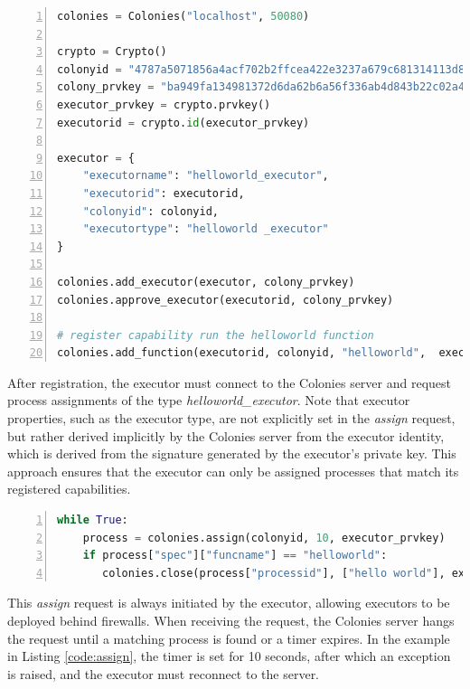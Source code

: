 \documentclass{article}
\begin{document}
\begin{lstlisting}[showstringspaces=false, frame=lines, numbers=left, numberstyle=\scriptsize, backgroundcolor=\color{background}, basicstyle=\small, label=code:regexecutor, language=Python, caption=Register an executor to a colony in Python.]
colonies = Colonies("localhost", 50080)

crypto = Crypto()
colonyid = "4787a5071856a4acf702b2ffcea422e3237a679c681314113d86139461290cf4"
colony_prvkey = "ba949fa134981372d6da62b6a56f336ab4d843b22c02a4257dcf7d0d73097514"
executor_prvkey = crypto.prvkey()
executorid = crypto.id(executor_prvkey)

executor = {
    "executorname": "helloworld_executor",
    "executorid": executorid,
    "colonyid": colonyid,
    "executortype": "helloworld _executor"
}

colonies.add_executor(executor, colony_prvkey)
colonies.approve_executor(executorid, colony_prvkey)

# register capability run the helloworld function
colonies.add_function(executorid, colonyid, "helloworld",  executor_prvkey)
\end{lstlisting}

After registration, the executor must connect to the Colonies server and request process assignments of the type \emph{helloworld\_executor}. Note that executor properties, such as the executor type, are not explicitly set in the \emph{assign} request, but rather derived implicitly by the Colonies server from the executor identity, which is derived from the signature generated by the executor's private key. This approach ensures that the executor can only be assigned processes that match its registered capabilities.

\begin{lstlisting}[showstringspaces=false, frame=lines, numbers=left, numberstyle=\scriptsize, backgroundcolor=\color{background}, basicstyle=\small, language=Python, label=code:assign, caption=Assigning and executing a process in Python.]
while True:
    process = colonies.assign(colonyid, 10, executor_prvkey)
    if process["spec"]["funcname"] == "helloworld":
       colonies.close(process["processid"], ["hello world"], executor_prvkey)
\end{lstlisting}

This \emph{assign} request is always initiated by the executor, allowing executors to be deployed behind firewalls. When receiving the request, the Colonies server hangs the request until a matching process is found or a timer expires. In the example in Listing \ref{code:assign}, the timer is set for 10 seconds, after which an exception is raised, and the executor must reconnect to the server.
\end{document}
